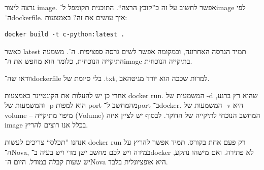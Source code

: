\documentclass[]{../../tex/classes/styledArticle}
\begin{document}
	נרצה ליצור image. אפשר לחשוב על זה כ''קובץ הרצה``. התוכנית תקומפל ל־image לפי ה־dockerfile. איך עושים את זה? באמצעות: 
	\sen\begin{lstlisting}
docker build -t c-python:latest .
	\end{lstlisting}\she
	כאשר latest תמיד הגרסה האחרונה, ובמקומה אפשר לשים גרסה ספציפית. ה־. משמעה התיקייה הנוכחית, כלומר הוא מחפש את ה־image בתיקייה הנוכחית.
	
	וודאו שה־dockerfile בלי סיומת של .txt, למרות שככה הוא יורד מגיטהאב. 
	
	אחרי כן יש להעלות את הקונטיינר באמצעות docker run. המשמעות של -d שהוא רץ ברגע, והמשמעות של -p הוא למפות port מהמחשב ל־port ב־docker. המשמעות של -v היא volume – מיפוי מתיקייה (Volume) המחשב הנוכחי לתיקייה של הדוקר. לבסוף יש לציין איזה image בכלל אנו רוצים להריץ. 
	
	אנחנו ''תכלס`` צריכים לעשות docker run רק פעם אחת בקורס. תמיד אפשר להריץ על ה־Nova, במידה ויש לכם מחשב ישן מדי ויש בעיה ב־docker לא פתירה. ואם מישהו נתקע, יש שעות קבלה במודל. היום ה־Nova היא אופציונלית בלבד. 
	
	
	\ndoc
\end{document}
